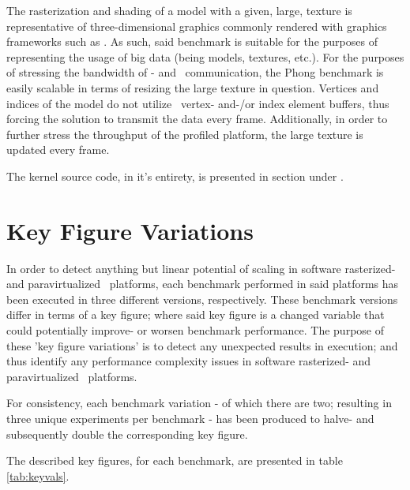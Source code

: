 The rasterization and shading of a model with a given, large, texture is representative of three-dimensional graphics commonly rendered with graphics frameworks such as \dvttermopenglestwopointo .
As such, said benchmark is suitable for the purposes of representing the usage of big data (being models, textures, etc.).
For the purposes of stressing the bandwidth of \dvttermtarget - and \dvttermhost\ communication, the Phong benchmark is easily scalable in terms of resizing the large texture in question.
Vertices and indices of the model do not utilize \dvttermopengl\ vertex- and-/or index element buffers, thus forcing the solution to transmit the data every frame.
Additionally, in order to further stress the throughput of the profiled platform, the large texture is updated every frame.

The kernel source code, in it's entirety, is presented in section  under .

\section{Key Figure Variations}
\label{sec:methodologyexperiment_keyfigurevariations}
In order to detect anything but linear potential of scaling in software rasterized- and paravirtualized \dvttermsimics\ platforms, each benchmark performed in said platforms has been executed in three different versions, respectively.
These benchmark versions differ in terms of a key figure; where said key figure is a changed variable that could potentially improve- or worsen benchmark performance.
The purpose of these 'key figure variations' is to detect any unexpected results in execution; and thus identify any performance complexity issues in software rasterized- and paravirtualized \dvttermsimics\ platforms.

For consistency, each benchmark variation - of which there are two; resulting in three unique experiments per benchmark - has been produced to halve- and subsequently double the corresponding key figure.

\noindent
The described key figures, for each benchmark, are presented in table \ref{tab:keyvals}.


